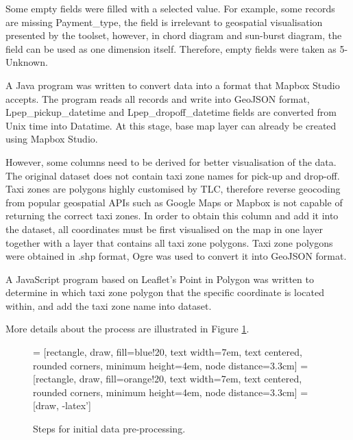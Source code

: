 \documentclass[11pt,a4paper]{article}
\begin{document}
Some empty fields were filled with a selected value. For example, some records are missing Payment\_type, the field is irrelevant to geospatial visualisation presented by the toolset, however, in chord diagram and sun-burst diagram, the field can be used as one dimension itself. Therefore, empty fields were taken as 5-Unknown.

A Java program was written to convert data into a format that Mapbox Studio accepts. The program reads all records and write into GeoJSON format, Lpep\_pickup\_datetime and Lpep\_dropoff\_datetime fields are converted from Unix time into Datatime. At this stage, base map layer can already be created using Mapbox Studio.

However, some columns need to be derived for better visualisation of the data. The original dataset does not contain taxi zone names for pick-up and drop-off. Taxi zones are polygons highly customised by TLC, therefore reverse geocoding from popular geospatial APIs such as Google Maps or Mapbox is not capable of returning the correct taxi zones. In order to obtain this column and add it into the dataset, all coordinates must be first visualised on the map in one layer together with a layer that contains all taxi zone polygons. Taxi zone polygons were obtained in .shp format, Ogre \parencite{Harter2017} was used to convert it into GeoJSON format.

A JavaScript program based on Leaflet's Point in Polygon \parencite{Mapbox2017b} was written to determine in which taxi zone polygon that the specific coordinate is located within, and add the taxi zone name into dataset.

More details about the process are illustrated in Figure \ref{fig:18}.

\begin{figure}[H]
	\centering
	 = [rectangle, draw, fill=blue!20, 
	text width=7em, text centered, rounded corners, minimum height=4em, node distance=3.3cm]
	 = [rectangle, draw, fill=orange!20, 
	text width=7em, text centered, rounded corners, minimum height=4em, node distance=3.3cm]
	 = [draw, -latex']
	\newline
	\caption{\label{fig:18} Steps for initial data pre-processing.}
\end{figure}
\end{document}
